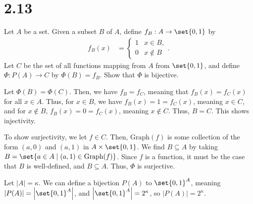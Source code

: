 \documentclass[10pt]{mypackage}
\begin{document}
\section{2.13}%
\begin{problem}
  Let $A$ be a set. Given a subset $B$ of $A$, define $f_B: A\rightarrow \set{0,1}$ by
  \begin{align*}
    f_B(x) &= \begin{cases}
      1 & x\in B,\\
      0 & x\notin B
    \end{cases}.
  \end{align*}
  Let $C$ be the set of all functions mapping from $A$ from $\set{0,1}$, and define $\Phi: P(A) \rightarrow C$ by $\Phi(B) = f_B$. Show that $\Phi$ is bijective.
\end{problem}
\begin{solution}
  Let $\Phi(B) = \Phi(C)$. Then, we have $f_B = f_C$, meaning that $f_B(x) = f_C(x)$ for all $x\in A$. Thus, for $x\in B$, we have $f_B(x) = 1 = f_C(x)$, meaning $x\in C$, and for $x\notin B$, $f_B(x) = 0 = f_C(x)$, meaning $x\notin C$. Thus, $B = C$. This shows injectivity.\newline

  To show surjectivity, we let $f\in C$. Then, $\text{Graph}(f)$ is some collection of the form $(a,0)$ and $(a,1)$ in $A\times \set{0,1}$. We find $B\subseteq A$ by taking $B = \set{a\in A\mid \left(a,1\right)\in \text{Graph}(f)}$. Since $f$ is a function, it must be the case that $B$ is well-defined, and $B\subseteq A$. Thus, $\Phi$ is surjective.\newline

  Let $\left\vert A \right\vert = \kappa$. We can define a bijection $P(A)$ to $\set{0,1}^{A}$, meaning $\left\vert P(A) \right\vert = \left\vert \set{0,1}^{A} \right\vert$, and $\left\vert \set{0,1}^{A} \right\vert = 2^{\kappa}$, so $\left\vert P(A) \right\vert = 2^{\kappa}$.
\end{solution}
\end{document}
